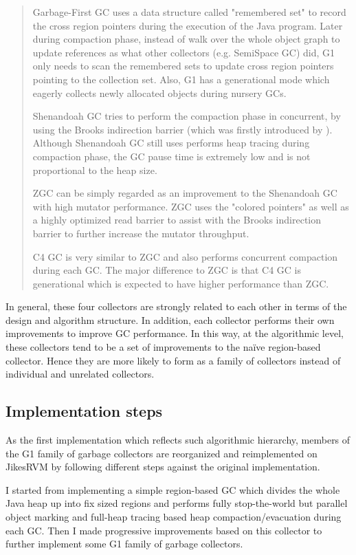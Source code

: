\begin{quote}
  Garbage-First GC uses a data structure called "remembered set" to record the
  cross region pointers during the execution of the Java program.
  Later during compaction phase, instead of walk over the whole object graph to update
  references as what other collectors (e.g. SemiSpace GC) did, G1 only needs to scan the
  remembered sets to update cross region pointers pointing to the collection set.
  Also, G1 has a generational mode which eagerly collects newly allocated objects
  during nursery GCs.

  Shenandoah GC tries to perform the compaction phase in concurrent, by using the
  Brooks indirection barrier (which was firstly introduced by \cite{brooks1984trading}).
  Although Shenandoah GC still uses performs heap tracing during compaction phase,
  the GC pause time is extremely low and is not proportional to the heap size.

  ZGC can be simply regarded as an improvement to the Shenandoah GC with high mutator performance.
  ZGC uses the "colored pointers"
  as well as a highly optimized read barrier to assist with the Brooks indirection barrier
  to further increase the mutator throughput.

  C4 GC is very similar to ZGC and also performs concurrent compaction during each
  GC. The major difference to ZGC is that C4 GC is generational which is expected
  to have higher performance than ZGC.
\end{quote}

In general, these four collectors are strongly related to each other in terms of
the design and algorithm structure. In addition, each collector performs their
own improvements to improve GC performance. In this way, at the algorithmic level,
these collectors tend to be a set of improvements to the naïve region-based collector.
Hence they are more likely to form as a family of collectors
instead of individual and unrelated collectors.

\subsection{Implementation steps}

As the first implementation which reflects such algorithmic hierarchy,
members of the G1 family of garbage collectors are reorganized and reimplemented on JikesRVM
by following different steps against the original implementation. 

I started from implementing a simple region-based GC which divides the whole Java heap
up into fix sized regions and performs fully stop-the-world but parallel object marking
and full-heap tracing based heap compaction/evacuation during each GC.
Then I made progressive improvements based on this collector to further implement some G1 family of garbage collectors.

